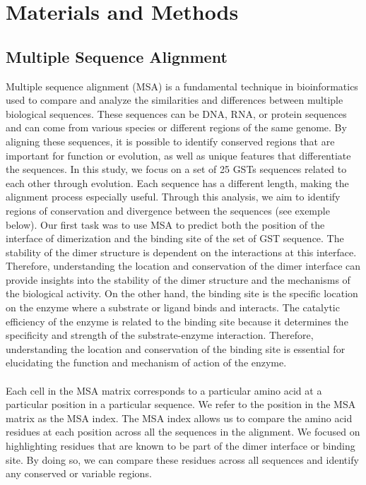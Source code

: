 \chapter{Materials and Methods}
\section{Multiple Sequence Alignment}
Multiple sequence alignment (MSA) is a fundamental technique in bioinformatics used to compare and analyze the similarities and differences between multiple biological sequences. These sequences can be DNA, RNA, or protein sequences and can come from various species or different regions of the same genome. By aligning these sequences, it is possible to identify conserved regions that are important for function or evolution, as well as unique features that differentiate the sequences.
In this study, we focus on a set of 25 GSTs sequences related to each other through evolution. Each sequence has a different length, making the alignment process especially useful. Through this analysis, we aim to identify regions of conservation and divergence between the sequences (see exemple below). Our first task was to use MSA to predict both the position of the interface of dimerization and the binding site of the set of GST sequence. The stability of the dimer structure is dependent on the interactions at this interface. Therefore, understanding the location and conservation of the dimer interface can provide insights into the stability of the dimer structure and the mechanisms of the biological activity. On the other hand, the binding site is the specific location on the enzyme where a substrate or ligand binds and interacts. The catalytic efficiency of the enzyme is related to the binding site because it determines the specificity and strength of the substrate-enzyme interaction. Therefore, understanding the location and conservation of the binding site is essential for elucidating the function and mechanism of action of the enzyme.\\
\\
\noindent Each cell in the MSA matrix corresponds to a particular amino acid at a particular position in a particular sequence. We refer to the position in the MSA matrix as the MSA index. The MSA index allows us to compare the amino acid residues at each position across all the sequences in the alignment. We focused on highlighting residues that are known to be part of the dimer interface or binding site. By doing so, we can compare these residues across all sequences and identify any conserved or variable regions.
